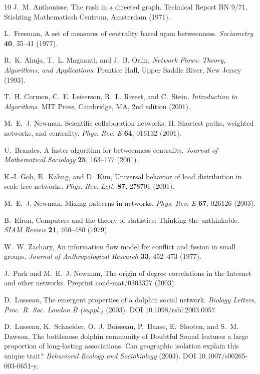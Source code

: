 \documentclass[twocolumn,pre,superscriptaddress]{revtex4}
\begin{document}
\begin{thebibliography}{10}
J.~M. Anthonisse, The rush in a directed graph. Technical Report BN 9/71,
  Stichting Mathematicsh Centrum, Amsterdam (1971).

L.~Freeman, A set of measures of centrality based upon betweenness.
  \textit{Sociometry} \textbf{40}, 35--41 (1977).

R.~K. Ahuja, T.~L. Magnanti, and J.~B. Orlin, \textit{Network Flows: Theory,
  Algorithms, and Applications}. Prentice Hall, Upper Saddle River, New Jersey
  (1993).

T.~H. Cormen, C.~E. Leiserson, R.~L. Rivest, and C.~Stein, \textit{Introduction
  to Algorithms}. MIT Press, Cambridge, MA, 2nd edition (2001).

M.~E.~J. Newman, Scientific collaboration networks: {II}. {S}hortest paths,
  weighted networks, and centrality. \textit{Phys. Rev. E} \textbf{64}, 016132
  (2001).

U.~Brandes, A faster algorithm for betweenness centrality. \textit{Journal of
  Mathematical Sociology} \textbf{25}, 163--177 (2001).

K.-I. Goh, B.~Kahng, and D.~Kim, Universal behavior of load distribution in
  scale-free networks. \textit{Phys. Rev. Lett.} \textbf{87}, 278701 (2001).

M.~E.~J. Newman, Mixing patterns in networks. \textit{Phys. Rev. E}
  \textbf{67}, 026126 (2003).

B.~Efron, Computers and the theory of statistics: Thinking the unthinkable.
  \textit{SIAM Review} \textbf{21}, 460--480 (1979).

W.~W. Zachary, An information flow model for conflict and fission in small
  groups. \textit{Journal of Anthropological Research} \textbf{33}, 452--473
  (1977).

J.~Park and M.~E.~J. Newman, The origin of degree correlations in the
  {I}nternet and other networks. Preprint cond-mat/0303327 (2003).

D.~Lusseau, The emergent properties of a dolphin social network.
  \textit{Biology Letters, Proc. R. Soc. London B (suppl.)}  (2003). DOI
  10.1098/rsbl.2003.0057.

D.~Lusseau, K.~Schneider, O.~J. Boisseau, P.~Haase, E.~Slooten, and S.~M.
  Dawson, The bottlenose dolphin community of {D}oubtful {S}ound features a
  large proportion of long-lasting associations. {C}an geographic isolation
  explain this unique trait? \textit{Behavioral Ecology and Sociobiology}
  (2003). DOI 10.1007/s00265-003-0651-y.


\end{thebibliography}
\end{document}
